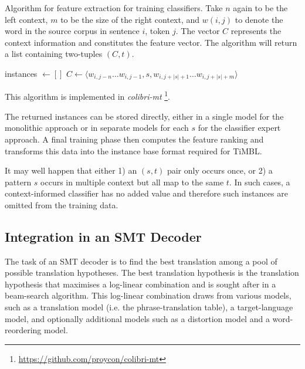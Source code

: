 \documentclass[smallextended]{svjour3}       %
\theoremstyle{break}
\begin{document}
\begin{algorithm}
\caption{Algorithm for feature extraction for training classifiers.  Take $n$
again to be the left context, $m$ to be the size of the right context, and
$w{(i,j)}$ to denote the word in the source corpus in sentence $i$, token $j$.
The vector $C$ represents the context information and constitutes the feature
vector.  The algorithm will return a list containing two-tuples $(C,t)$.  }
\label{alg:featureextract}
\begin{algorithmic}
\State instances $\gets []$
        \State $C \gets \langle w_{i,j-n} \ldots w_{i,j-1}, s, w_{i,j+|s|+1} \ldots w_{i,j+|s|+m} \rangle$
        \State {} 
      \EndFor
  \EndFor
\EndFor \\
\end{algorithmic}
\end{algorithm}
    
This algorithm is implemented in \emph{colibri-mt}
\footnote{\url{https://github.com/proycon/colibri-mt}}.

The returned instances can be stored directly, either in a single model for the
monolithic approach or in separate models for each $s$ for the classifier
expert approach. A final training phase then computes the feature ranking and
transforms this data into the instance base format required for TiMBL.

It may well happen that either 1) an $(s,t)$ pair only occurs once, or
2) a pattern $s$ occurs in multiple context but all map to the same
$t$. In such cases, a context-informed classifier has no added value
and therefore such instances are omitted from the training data.

\subsection{Integration in an SMT Decoder}
\label{sec:smtintegration}

The task of an SMT decoder is to find the best translation among a pool
of possible translation hypotheses. The best translation hypothesis is the
translation hypothesis that maximises a log-linear combination and is sought
after in a beam-search algorithm. This log-linear combination draws from
various models, such as a translation model (i.e. the phrase-translation
table), a target-language model, and optionally additional models such as a
distortion model and a word-reordering model. 
\end{document}
